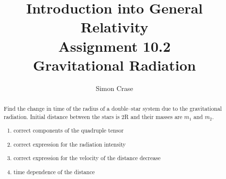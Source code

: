 \documentclass[]{article}
\title{Introduction into General Relativity\\Assignment 10.2\\Gravitational Radiation}
\author{Simon Crase}
\begin{document}
\maketitle

\begin{abstract}
Find the change in time of the radius of a double--star system due to the gravitational radiation. Initial distance between the stars is 2R and their masses are $m_1$ and $m_2$.
\begin{enumerate}
	\item correct components of the quadruple tensor
	\item correct expression for the radiation intensity
	\item correct expression for the velocity of the distance decrease
	\item time dependence of the distance
\end{enumerate}
\end{abstract}

\section{}
\end{document}
